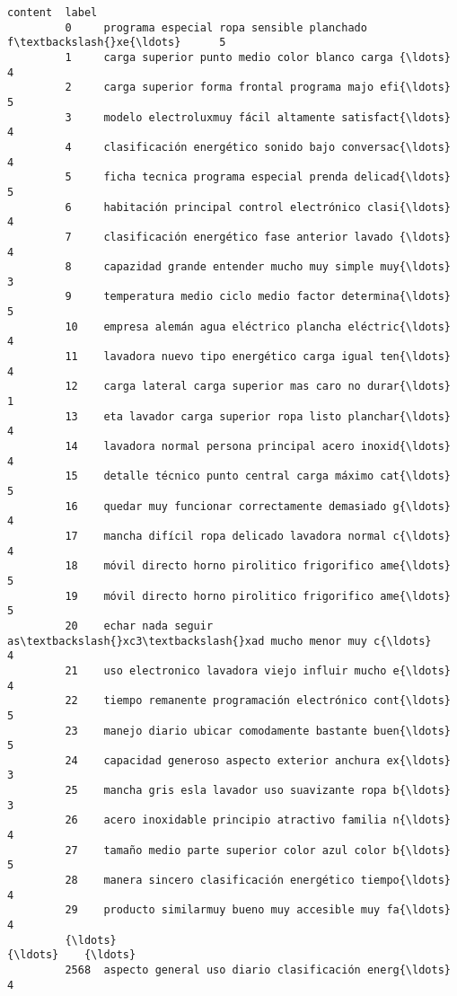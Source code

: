 \documentclass{article}
\begin{document}
\begin{Verbatim}[commandchars=\\\{\}]
                                                         content  label  
         0     programa especial ropa sensible planchado f\textbackslash{}xe{\ldots}      5  
         1     carga superior punto medio color blanco carga {\ldots}      4  
         2     carga superior forma frontal programa majo efi{\ldots}      5  
         3     modelo electroluxmuy fácil altamente satisfact{\ldots}      4  
         4     clasificación energético sonido bajo conversac{\ldots}      4  
         5     ficha tecnica programa especial prenda delicad{\ldots}      5  
         6     habitación principal control electrónico clasi{\ldots}      4  
         7     clasificación energético fase anterior lavado {\ldots}      4  
         8     capazidad grande entender mucho muy simple muy{\ldots}      3  
         9     temperatura medio ciclo medio factor determina{\ldots}      5  
         10    empresa alemán agua eléctrico plancha eléctric{\ldots}      4  
         11    lavadora nuevo tipo energético carga igual ten{\ldots}      4  
         12    carga lateral carga superior mas caro no durar{\ldots}      1  
         13    eta lavador carga superior ropa listo planchar{\ldots}      4  
         14    lavadora normal persona principal acero inoxid{\ldots}      4  
         15    detalle técnico punto central carga máximo cat{\ldots}      5  
         16    quedar muy funcionar correctamente demasiado g{\ldots}      4  
         17    mancha difícil ropa delicado lavadora normal c{\ldots}      4  
         18    móvil directo horno pirolitico frigorifico ame{\ldots}      5  
         19    móvil directo horno pirolitico frigorifico ame{\ldots}      5  
         20    echar nada seguir as\textbackslash{}xc3\textbackslash{}xad mucho menor muy c{\ldots}      4  
         21    uso electronico lavadora viejo influir mucho e{\ldots}      4  
         22    tiempo remanente programación electrónico cont{\ldots}      5  
         23    manejo diario ubicar comodamente bastante buen{\ldots}      5  
         24    capacidad generoso aspecto exterior anchura ex{\ldots}      3  
         25    mancha gris esla lavador uso suavizante ropa b{\ldots}      3  
         26    acero inoxidable principio atractivo familia n{\ldots}      4  
         27    tamaño medio parte superior color azul color b{\ldots}      5  
         28    manera sincero clasificación energético tiempo{\ldots}      4  
         29    producto similarmuy bueno muy accesible muy fa{\ldots}      4  
         {\ldots}                                                 {\ldots}    {\ldots}  
         2568  aspecto general uso diario clasificación energ{\ldots}      4  

\end{Verbatim}
\end{document}
